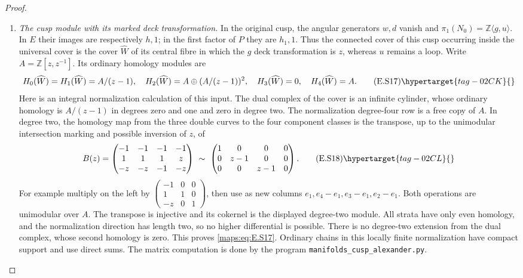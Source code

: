 \begin{proof}
\begin{enumerate}[label={$\langle1\rangle$\arabic*.},leftmargin=*]
\item \emph{The cusp module with its marked deck transformation.}
In the original cusp, the angular generators $w,d$ vanish and
$\pi_1(N_0)=\mathbb Z\langle g,u\rangle$. In $E$ their images
are respectively $h,1$; in the first factor of $P$ they are
$h_1,1$. Thus the connected cover of this cusp occurring inside
the universal cover is the cover $\widehat W$ of its central
fibre in which the $g$ deck transformation is $z$, whereas $u$
remains a loop. Write $A=\mathbb Z[z,z^{-1}]$.
Its ordinary homology modules are
\[
 H_0(\widehat W)=H_1(\widehat W)=A/(z-1),\quad
 H_2(\widehat W)=A\oplus(A/(z-1))^2,
 \quad H_3(\widehat W)=0,\quad H_4(\widehat W)=A.
 \tag{E.S17}\hypertarget{tag-02CK}{}\label{maps:eq:E.S17}
\]
Here is an integral normalization calculation of this input.
The dual complex of the cover is an infinite cylinder, whose
ordinary homology is $A/(z-1)$ in degrees zero and one and zero
in degree two. The normalization degree-four row is a free
copy of $A$. In degree two, the homology map from the three
double curves to the four component classes is the transpose,
up to the unimodular intersection marking and possible inversion
of $z$, of
\[
 B(z)=\begin{pmatrix}
 -1&-1&-1&-1\\ 1&1&1&z\\-z&-z&-1&-z
 \end{pmatrix}
 \ \sim\
 \begin{pmatrix}1&0&0&0\\0&z-1&0&0\\0&0&z-1&0\end{pmatrix}.
 \tag{E.S18}\hypertarget{tag-02CL}{}\label{maps:eq:E.S18}
\]
For example multiply on the left by
$\left(\begin{smallmatrix}-1&0&0\\1&1&0\\-z&0&1\end{smallmatrix}\right)$,
then use as new columns $e_1,e_4-e_1,e_3-e_1,e_2-e_1$.
Both operations are unimodular over $A$. The transpose is
injective and its cokernel is the displayed degree-two module.
All strata have only even homology, and the normalization
direction has length two, so no higher differential is possible.
There is no degree-two extension from the dual complex, whose
second homology is zero. This proves \eqref{maps:eq:E.S17}. Ordinary chains
in this locally finite normalization have compact support and
use direct sums. The matrix computation is done by the program \texttt{manifolds\_cusp\_alexander.py}.


\end{enumerate}
\end{proof}
